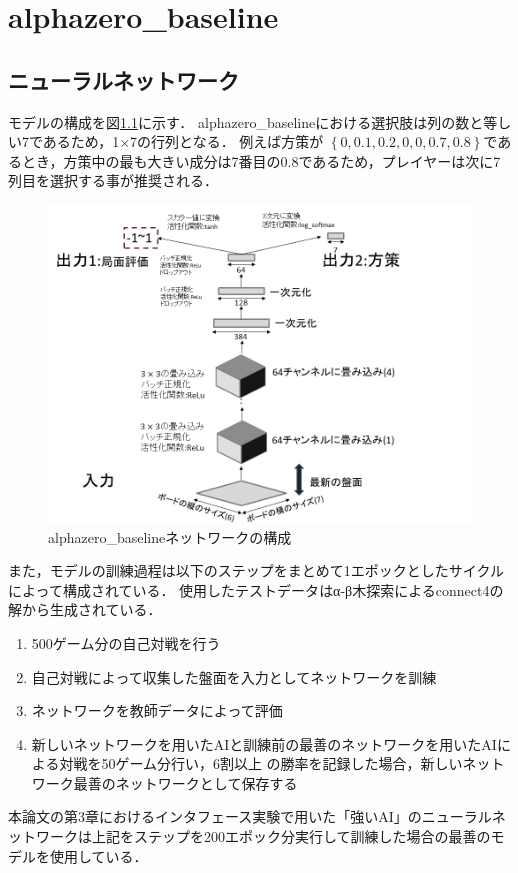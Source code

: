 \chapter{alphazero\_baseline}
\label{chap:baseline}
\section{ニューラルネットワーク}
モデルの構成を図\ref{fig:baselineNetwork}に示す．
alphazero\_baselineにおける選択肢は列の数と等しい7であるため，1$\times$7の行列となる．
例えば方策が
$\left\{0, 0.1, 0.2, 0, 0, 0.7, 0.8\right\}$であるとき，方策中の最も大きい成分は7番目の0.8であるため，プレイヤーは次に7列目を選択する事が推奨される．
\begin{figure}[htbp]
	\centering
	\includegraphics[width=\linewidth]{./figure/baselineNetwork.png}
	\caption{alphazero\_baselineネットワークの構成}
	\label{fig:baselineNetwork}
\end{figure}
また，モデルの訓練過程は以下のステップをまとめて1エポックとしたサイクルによって構成されている．
使用したテストデータ\cite{dataset}はα-β木探索によるconnect4の解から生成されている\cite{scoring}．
\begin{enumerate}
	\item 500ゲーム分の自己対戦を行う
	\item 自己対戦によって収集した盤面を入力としてネットワークを訓練
    \item ネットワークを教師データによって評価
    \item 新しいネットワークを用いたAIと訓練前の最善のネットワークを用いたAIによる対戦を50ゲーム分行い，6割以上
    の勝率を記録した場合，新しいネットワーク最善のネットワークとして保存する

\end{enumerate}
本論文の第3章におけるインタフェース実験で用いた「強いAI」のニューラルネットワークは上記をステップを200エポック分実行して訓練した場合の最善のモデルを使用している．

